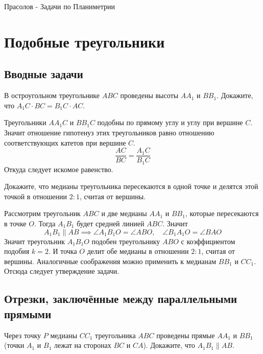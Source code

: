 \documentclass[11pt, a4paper]{common/document_template}
\begin{document}
\begin{titlepage}
  \begin{center}
	\Huge{Прасолов - Задачи по Планиметрии}
  \end{center}
\end{titlepage}   

\chapter{Подобные треугольники}

\section{Вводные задачи}

\begin{exercise}
В остроугольном треугольнике $ABC$ проведены высоты $AA_{1}$ и $BB_{1}$. Докажите, что $A_{1} C \cdot BC = B_{1}C \cdot AC$.
\end{exercise}

\begin{Solution}
Треугольники $AA_{1}C$ и $BB_{1}C$ подобны по прямому углу и углу при вершине $C$. Значит отношение гипотенуз этих треугольников равно отношению соответствующих катетов при вершине $C$. 
$$
\frac{AC}{BC} = \frac{A_{1}C}{B_{1}C}
$$
Откуда следует искомое равенство.
\end{Solution}

\begin{exercise}
Докажите, что медианы треугольника пересекаются в одной точке и делятся этой точкой в отношении $2 : 1$, считая от вершины.
\end{exercise}

\begin{Solution}
Рассмотрим треугольник $ABC$ и две медианы $AA_{1}$ и $BB_{1}$, которые пересекаются в точке $O$. Тогда $A_{1}B_{1}$ будет средней линией $ABC$. Значит
$$
A_{1}B_{1} \parallel AB \implies \angle A_{1}B_{1}O = \angle ABO, \quad \angle B_{1}A_{1}O = \angle BAO 
$$
Значит треугольник $A_{1}B_{1}O$ подобен треугольнику $ABO$ с коэффициентом подобия $k = 2$. И точка $O$ делит обе медианы в отношении $2 : 1$, считая от вершины. Аналогичные соображения можно применить к медианам $BB_{1}$ и $CC_{1}$. Отсюда следует утверждение задачи.
\end{Solution}

\section{Отрезки, заключённые между параллельными прямыми}

\begin{exercise}
Через точку $P$ медианы $CC_{1}$ треугольника $ABC$ проведены прямые $AA_{1}$ и $BB_{1}$ (точки $A_{1}$ и $B_{1}$ лежат на сторонах $BC$ и $CA$). Докажите, что $A_{1} B_{1} \parallel AB$.
\end{exercise}
\end{document}
